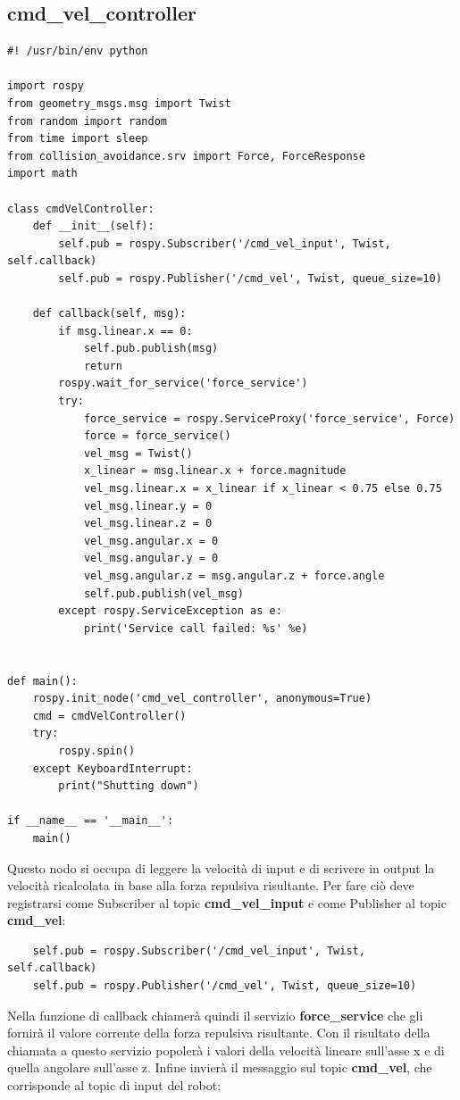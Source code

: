 \documentclass[Lau, binding=0.6cm, oneside]{sapthesis}
\begin{document}
\subsection{cmd\_vel\_controller}
\begin{lstlisting}
#! /usr/bin/env python

import rospy
from geometry_msgs.msg import Twist
from random import random
from time import sleep
from collision_avoidance.srv import Force, ForceResponse
import math

class cmdVelController:
    def __init__(self):
        self.pub = rospy.Subscriber('/cmd_vel_input', Twist, self.callback)
        self.pub = rospy.Publisher('/cmd_vel', Twist, queue_size=10)
    
    def callback(self, msg):
        if msg.linear.x == 0:
            self.pub.publish(msg)
            return
        rospy.wait_for_service('force_service')
        try:
            force_service = rospy.ServiceProxy('force_service', Force)
            force = force_service()
            vel_msg = Twist()
            x_linear = msg.linear.x + force.magnitude
            vel_msg.linear.x = x_linear if x_linear < 0.75 else 0.75
            vel_msg.linear.y = 0
            vel_msg.linear.z = 0
            vel_msg.angular.x = 0
            vel_msg.angular.y = 0
            vel_msg.angular.z = msg.angular.z + force.angle
            self.pub.publish(vel_msg)
        except rospy.ServiceException as e:
            print('Service call failed: %s' %e)


def main():
    rospy.init_node('cmd_vel_controller', anonymous=True)
    cmd = cmdVelController()
    try:
        rospy.spin()
    except KeyboardInterrupt:
        print("Shutting down")

if __name__ == '__main__':
    main()
\end{lstlisting}

Questo nodo si occupa di leggere la velocità di input e di scrivere in output la velocità ricalcolata in base alla forza repulsiva risultante.
Per fare ciò deve registrarsi come Subscriber al topic \textbf{cmd\_vel\_input} e come Publisher al topic \textbf{cmd\_vel}:

\begin{lstlisting}
    self.pub = rospy.Subscriber('/cmd_vel_input', Twist, self.callback)
    self.pub = rospy.Publisher('/cmd_vel', Twist, queue_size=10)
\end{lstlisting}

Nella funzione di callback chiamerà quindi il servizio \textbf{force\_service} che gli fornirà il valore corrente della forza repulsiva risultante.
Con il risultato della chiamata a questo servizio popolerà i valori della velocità lineare sull'asse x e di quella angolare sull'asse z.
Infine invierà il messaggio sul topic \textbf{cmd\_vel}, che corrisponde al topic di input del robot:
\end{document}
